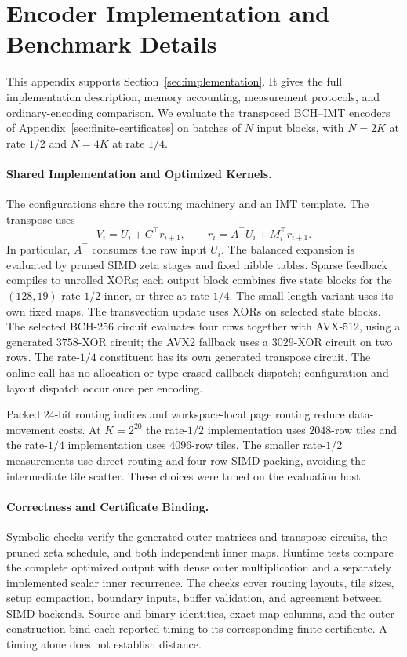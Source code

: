 \section{Encoder Implementation and Benchmark Details}
\label{app:implementation}

This appendix supports Section~\ref{sec:implementation}.
It gives the full implementation description, memory accounting,
measurement protocols, and ordinary-encoding comparison.
We evaluate the transposed BCH--IMT encoders of
Appendix~\ref{sec:finite-certificates} on batches of $N$ input blocks, with
$N=2K$ at rate $1/2$ and $N=4K$ at rate $1/4$.

\paragraph{Shared Implementation and Optimized Kernels.}
The configurations share the routing machinery and an IMT template.
The transpose uses
\[
 V_i=U_i+C^\top r_{i+1},\qquad r_i=A^\top U_i+M_i^\top r_{i+1}.
\]
In particular, $A^\top$ consumes the raw input $U_i$.
The balanced expansion is evaluated by pruned SIMD zeta stages and fixed
nibble tables. Sparse feedback compiles to unrolled XORs; each output
block combines five state blocks for the $(128,19)$ rate-$1/2$ inner,
or three at rate $1/4$. The small-length variant uses its own fixed maps.
The transvection update uses XORs on selected state blocks.
The selected BCH-256 circuit evaluates four rows together with AVX-512,
using a generated $3758$-XOR circuit; the AVX2 fallback uses a
$3029$-XOR circuit on two rows. The rate-$1/4$ constituent has its own generated
transpose circuit. The online call has no allocation or type-erased
callback dispatch; configuration and layout dispatch occur once per encoding.

Packed $24$-bit routing indices and workspace-local page routing reduce
data-movement costs. At $K=2^{20}$ the rate-$1/2$ implementation uses
$2048$-row tiles and the rate-$1/4$ implementation uses $4096$-row tiles.
The smaller rate-$1/2$ measurements use direct routing and four-row SIMD
packing, avoiding the intermediate tile scatter.
These choices were tuned on the evaluation host.

\paragraph{Correctness and Certificate Binding.}
Symbolic checks verify the generated outer matrices and transpose circuits,
the pruned zeta schedule, and both independent inner maps.
Runtime tests compare the complete optimized output with dense outer
multiplication and a separately implemented scalar inner recurrence.
The checks cover routing layouts, tile sizes, setup compaction,
boundary inputs, buffer validation, and agreement between SIMD backends.
Source and binary identities, exact map columns,
and the outer construction bind each reported timing to its corresponding
finite certificate. A timing alone does not establish distance.

